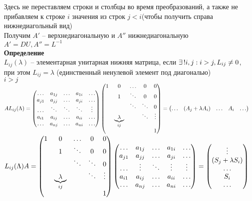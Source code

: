 \documentclass[12pt]{article}
\begin{document}
Здесь не переставляем строки и столбцы во время преобразований, а также не прибавляем к строке $i$ значения из строк $j < i$(чтобы получить справа нижнедиагольный вид)\\
Получим $A'$ -- верхнедиагональную и $A''$ нижнедиагональную\\
$A'=DU, A''=L^{-1}$\\
\textbf{Определение}\\
$L_{ij}(\lambda)$ -- элементарная унитарная нижняя матрица, если $\exists\,! i, j: i > j, L_{ij} \neq 0$, при этом $L_{ij} = \lambda$ (единственный ненулевой элемент под диагональю)\\
$i > j$\\
$AL_{ij}(\Lambda) = \begin{pmatrix}
    \ldots & a_{1j} & \ldots & a_{1i} & \ldots\\
    a_{j1} & a_{jj} & \ldots & a_{ji} & \ldots\\
    \ldots & \ddots & \ddots & \ddots & \vdots\\
    a_{i1} & a_{ij} & \ldots & a_{ii} & \ldots\\
    \ldots & a_{nj} & \ldots & a_{ni} & \ldots\\
\end{pmatrix}\begin{pmatrix}
    1 & 0 & \ldots & 0 & 0\\
    & 1 & \ddots & 0 & 0\\
    & & \ddots & \ddots & 0\\
    & \underbrace{\lambda}_{ij} & & \ddots & \vdots\\
    & & & & 1
\end{pmatrix} = \begin{pmatrix}\ldots & (A_j + \lambda A_i) & \ldots & A_i & \ldots\end{pmatrix}$\\
$L_{ij}(\Lambda)A = \begin{pmatrix}
    1 & 0 & \ldots & 0 & 0\\
    & 1 & \ddots & 0 & 0\\
    & & \ddots & \ddots & 0\\
    & \underbrace{\lambda}_{ij} & & \ddots & \vdots\\
    & & & & 1
\end{pmatrix}\begin{pmatrix}
    \ldots & a_{1j} & \ldots & a_{1i} & \ldots\\
    a_{j1} & a_{jj} & \ldots & a_{ji} & \ldots\\
    \ldots & \vdots & \ddots & \vdots & \vdots\\
    a_{i1} & a_{ij} & \ldots & a_{ii} & \ldots\\
    \ldots & a_{nj} & \ldots & a_{ni} & \ldots\\
\end{pmatrix} = \begin{pmatrix}\vdots\\ (S_j + \lambda S_i)\\ \ldots\\ S_i\\ \ldots\end{pmatrix}$
\end{document}
